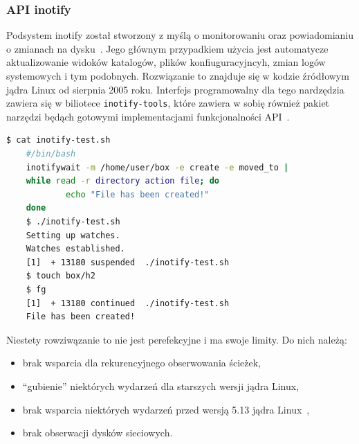 \subsubsection{API inotify}
Podsystem inotify został stworzony z myślą o monitorowaniu oraz powiadomianiu o zmianach na dysku~\cite{love_linux_2013}. 
Jego głównym przypadkiem użycia jest automatycze aktualizowanie widoków katalogów, plików konfiuguracyjncyh, zmian
logów systemowych i tym podobnych. Rozwiązanie to znajduje się w kodzie źródłowym jądra Linux od sierpnia 2005 roku. Interfejs programowalny
dla tego nardzędzia zawiera się w biliotece \texttt{inotify-tools}, które zawiera w sobię również pakiet narzędzi będąch gotowymi implementacjami funkcjonalności API~\cite{biancalana_inotfy}.
\begin{lstlisting}[language=bash,
    backgroundcolor=\color{EEGold!5!white},
    caption={Przykład użycia narzędzia \texttt{inotifywait}.
    Po utworzeniu pliku ukazała się odpowiednia wiadomość},
    label={lst:helloC}]
    $ cat inotify-test.sh
    #/bin/bash
    inotifywait -m /home/user/box -e create -e moved_to |
    while read -r directory action file; do
            echo "File has been created!"
    done
    $ ./inotify-test.sh
    Setting up watches.
    Watches established.
    [1]  + 13180 suspended  ./inotify-test.sh
    $ touch box/h2
    $ fg
    [1]  + 13180 continued  ./inotify-test.sh
    File has been created!
\end{lstlisting}
Niestety rowziwązanie to nie jest perefekcyjne i ma swoje limity. Do nich należą:
\begin{itemize}
    \item brak wsparcia dla rekurencyjnego obserwowania ścieżek,
    \item \enquote{gubienie} niektórych wydarzeń dla starszych wersji jądra Linux,
    \item brak wsparcia niektórych wydarzeń przed wersją 5.13 jądra Linux~\cite{fanotify7},
    \item brak obserwacji dysków sieciowych.
\end{itemize}
\newpage
